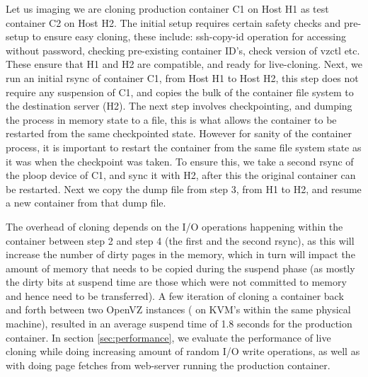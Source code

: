 Let us imaging we are cloning production container C1 on Host H1 as test container C2 on Host H2. 
The initial setup requires certain safety checks and pre-setup to ensure easy cloning, these include: ssh-copy-id operation for accessing without password, checking pre-existing container ID's, check version of vzctl etc. 
These ensure that H1 and H2 are compatible, and ready for live-cloning.
Next, we run an initial rsync of container C1, from Host H1 to Host H2, this step does not require any suspension of C1, and copies the bulk of the container file system to the destination server (H2). 
The next step involves checkpointing, and dumping the process in memory state to a file, this is what allows the container to be restarted from the same checkpointed state. 
However for sanity of the container process, it is important to restart the container from the same file system state as it was when the checkpoint was taken.
To ensure this, we take a second rsync of the ploop device of C1, and sync it with H2, after this the original container can be restarted.
Next we copy the dump file from step 3, from H1 to H2, and resume a new container from that dump file.

The overhead of cloning depends on the I/O operations happening within the container between step 2 and step 4 (the first and the second rsync), as this will increase the number of dirty pages in the memory, which in turn will impact the amount of memory that needs to be copied during the suspend phase (as mostly the dirty bits at suspend time are those which were not committed to memory and hence need to be transferred).  
A few iteration of cloning a container back and forth between two OpenVZ instances ( on KVM's within the same physical machine), resulted in an average suspend time of 1.8 seconds for the production container.
In section \ref{sec:performance}, we evaluate the performance of live cloning while doing increasing amount of random I/O write operations, as well as with doing page fetches  from web-server running the production container.





